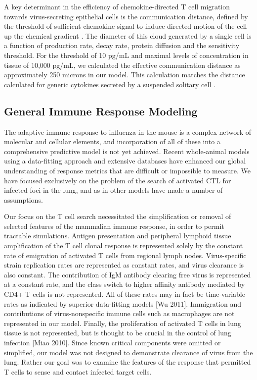 \documentclass[10pt]{article}
\begin{document}
A key determinant in the efficiency of chemokine-directed T cell migration towards virus-secreting epithelial cells is the communication distance, defined by the threshold of sufficient chemokine signal to induce directed motion of the cell up the chemical gradient \cite{Thelen2008}.  The diameter of this cloud generated by a single cell is a function of production rate, decay rate, protein diffusion and the sensitivity threshold.  For the threshold of 10 pg/mL and maximal levels of concentration in tissue of 10,000 pg/mL, we calculated the effective communication distance as approximately 250 microns in our model.  This calculation matches the distance calculated for generic cytokines secreted by a suspended solitary cell \cite{Francis1997}.

\subsection*{General Immune Response Modeling}

The adaptive immune response to influenza in the mouse is a complex network of molecular and cellular elements, and incorporation of all of these into a comprehensive predictive model is not yet achieved.  Recent whole-animal models using a data-fitting approach and extensive databases have enhanced our global understanding of response metrics that are difficult or impossible to measure.  We have focused exclusively on the problem of the search of activated CTL for infected foci in the lung, and as in other models have made a number of assumptions.

Our focus on the T cell search necessitated the simplification or removal of selected features of the mammalian immune response, in order to permit tractable simulations.  Antigen presentation and peripheral lymphoid tissue amplification of the T cell clonal response is represented solely by the constant rate of emigration of activated T cells from regional lymph nodes.  Virus-specific strain replication rates are represented as constant rates, and virus clearance is also constant.  The contribution of IgM antibody clearing free virus is represented at a constant rate, and the class switch to higher affinity antibody mediated by CD4+ T cells is not represented.  All of these rates may in fact be time-variable rates as indicated by superior data-fitting models [Wu 2011].  Immigration and contributions of virus-nonspecific immune cells such as macrophages are not represented in our model.  Finally, the proliferation of activated T cells in lung tissue is not represented, but is thought to be crucial in the control of lung infection [Miao 2010].  Since known critical components were omitted or simplified, our model was not designed to demonstrate clearance of virus from the lung.  Rather our goal was to examine the features of the response that permitted T cells to sense and contact infected target cells.
\end{document}
